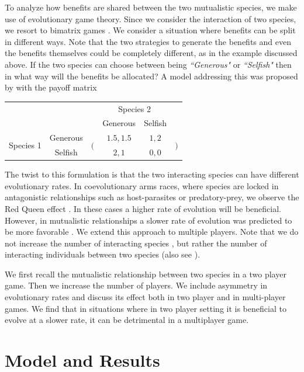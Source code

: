 \documentclass[a4paper]{scrartcl}
\begin{document}
To analyze how benefits are shared between the two mutualistic species, we make use of evolutionary game theory.
Since we consider the interaction of two species, we resort to bimatrix games
\citep{weibull:1995hp,hofbauer:1996mm,hofbauer:1998mm}.
We consider a situation where benefits can be split in different ways.
Note that the two strategies to generate the benefits and even the benefits themselves
could be completely different, as in the example discussed above. 
If the two species can choose between being \textit{``Generous"} or \textit{``Selfish"}  then in what way will the benefits be allocated?
A model addressing this was proposed by \citet{bergstrom:2003jf} with the payoff matrix
%
\begin{center}
\begin{tabular}{cccccc}
& & & \multicolumn{2}{c}{Species 2} &\\
& & & Generous & Selfish &\\
\multirow{2}{*}{Species 1}& Generous
& \multirow{2}{*}{$\bigg($} & $1.5, 1.5$ & $1, 2$ & \multirow{2}{*}{$\bigg)$}\\
& Selfish & & $2, 1$ & $0, 0$ &\ \ .
\end{tabular}
\end{center}
%
The twist to this formulation is that the two interacting species can have different evolutionary rates.
In coevolutionary arms races, where species are locked in antagonistic relationships such as host-parasites or predatory-prey, we observe the Red Queen effect
\citep{vanVaalen:1973aa}.
In these cases a higher rate of evolution will be beneficial.
However, in mutualistic relationships a slower rate of evolution was predicted to be more favorable \citep{bergstrom:2003jf}.
We extend this approach to multiple players.
Note that we do not increase the number of interacting species \citep{mack:2008aa,damore:2011ev}, but rather the number of interacting individuals between two species (also see \citep{wang:2011aa}).

We first
recall the mutualistic relationship between two species in a two player game.
Then we increase the number of players.
We include asymmetry in evolutionary rates and discuss its effect both in two player and in multi-player games.
We find that in situations where in two player setting it is beneficial to evolve at a slower rate, it can be detrimental in a multiplayer game.


\section*{Model and Results}
\end{document}
